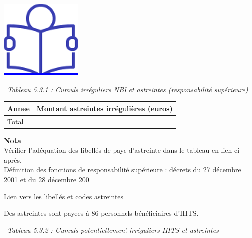 \href{../Docs/Notices/fiche_astreintes.odt}{\includegraphics{icones/Notice.png}}

~\emph{Tableau 5.3.1 : Cumuls irréguliers NBI et astreintes
(responsabilité supérieure)}

\begin{longtable}[]{@{}ll@{}}
\toprule
Annee & Montant astreintes irrégulières (euros)\tabularnewline
\midrule
\endhead
Total &\tabularnewline
\bottomrule
\end{longtable}

\textbf{Nota}\\
Vérifier l'adéquation des libellés de paye d'astreinte dans le tableau
en lien ci-après.\\
Définition des fonctions de responsabilité supérieure : décrets du 27
décembre 2001 et du 28 décembre 200

\href{../Bases/Reglementation/libelles.astreintes.csv}{Lien vers les
libellés et codes astreintes}

Des astreintes sont payees à 86 personnels bénéficiaires d'IHTS.

~\emph{Tableau 5.3.2 : Cumuls potentiellement irréguliers IHTS et
astreintes}

